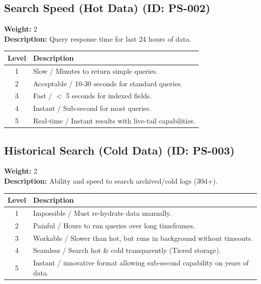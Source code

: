 \documentclass{article}
\begin{document}
\subsection{Search Speed (Hot Data) (ID: PS-002)}
\textbf{Weight:} 2 \\
\textbf{Description:} Query response time for last 24 hours of data.
\vspace{0.3cm}
\begin{longtable}{|c|p{12cm}|}
\hline
\rowcolor{lightgray} \textbf{Level} & \textbf{Description} \\ \hline
1 & Slow / Minutes to return simple queries. \\ \hline
2 & Acceptable / 10-30 seconds for standard queries. \\ \hline
3 & Fast / $<$ 5 seconds for indexed fields. \\ \hline
4 & Instant / Sub-second for most queries. \\ \hline
5 & Real-time / Instant results with live-tail capabilities. \\ \hline
\end{longtable}
\vspace{0.5cm}
\subsection{Historical Search (Cold Data) (ID: PS-003)}
\textbf{Weight:} 2 \\
\textbf{Description:} Ability and speed to search archived/cold logs (30d+).
\vspace{0.3cm}
\begin{longtable}{|c|p{12cm}|}
\hline
\rowcolor{lightgray} \textbf{Level} & \textbf{Description} \\ \hline
1 & Impossible / Must re-hydrate data manually. \\ \hline
2 & Painful / Hours to run queries over long timeframes. \\ \hline
3 & Workable / Slower than hot, but runs in background without timeouts. \\ \hline
4 & Seamless / Search hot \& cold transparently (Tiered storage). \\ \hline
5 & Instant / innovative format allowing sub-second capability on years of data. \\ \hline
\end{longtable}
\vspace{0.5cm}
\end{document}
